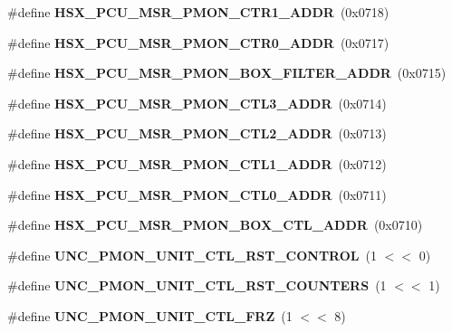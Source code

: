 \begin{DoxyCompactItemize}
\item 
\mbox{\label{types_8h_af364a115d3c96668cd4f7cc49de536c0}} 
\#define {\bfseries H\+S\+X\+\_\+\+P\+C\+U\+\_\+\+M\+S\+R\+\_\+\+P\+M\+O\+N\+\_\+\+C\+T\+R1\+\_\+\+A\+D\+DR}~(0x0718)
\item 
\mbox{\label{types_8h_a9c523fc1e96d8d3f84af7139e1aea411}} 
\#define {\bfseries H\+S\+X\+\_\+\+P\+C\+U\+\_\+\+M\+S\+R\+\_\+\+P\+M\+O\+N\+\_\+\+C\+T\+R0\+\_\+\+A\+D\+DR}~(0x0717)
\item 
\mbox{\label{types_8h_a4df4be5e87246efb1c7c5efc60c3d54b}} 
\#define {\bfseries H\+S\+X\+\_\+\+P\+C\+U\+\_\+\+M\+S\+R\+\_\+\+P\+M\+O\+N\+\_\+\+B\+O\+X\+\_\+\+F\+I\+L\+T\+E\+R\+\_\+\+A\+D\+DR}~(0x0715)
\item 
\mbox{\label{types_8h_ab6a84afc8059ff3fbdd3e31c4c5c7eab}} 
\#define {\bfseries H\+S\+X\+\_\+\+P\+C\+U\+\_\+\+M\+S\+R\+\_\+\+P\+M\+O\+N\+\_\+\+C\+T\+L3\+\_\+\+A\+D\+DR}~(0x0714)
\item 
\mbox{\label{types_8h_aff25e26c9829b71d5e152803b05d5b87}} 
\#define {\bfseries H\+S\+X\+\_\+\+P\+C\+U\+\_\+\+M\+S\+R\+\_\+\+P\+M\+O\+N\+\_\+\+C\+T\+L2\+\_\+\+A\+D\+DR}~(0x0713)
\item 
\mbox{\label{types_8h_ae4771b69f2b2f8768dfb6864f8f01938}} 
\#define {\bfseries H\+S\+X\+\_\+\+P\+C\+U\+\_\+\+M\+S\+R\+\_\+\+P\+M\+O\+N\+\_\+\+C\+T\+L1\+\_\+\+A\+D\+DR}~(0x0712)
\item 
\mbox{\label{types_8h_ae2ba1df84934237c90c8960b9b8087c8}} 
\#define {\bfseries H\+S\+X\+\_\+\+P\+C\+U\+\_\+\+M\+S\+R\+\_\+\+P\+M\+O\+N\+\_\+\+C\+T\+L0\+\_\+\+A\+D\+DR}~(0x0711)
\item 
\mbox{\label{types_8h_a9c0e92fd4e80ecf71b5872a577e7cab3}} 
\#define {\bfseries H\+S\+X\+\_\+\+P\+C\+U\+\_\+\+M\+S\+R\+\_\+\+P\+M\+O\+N\+\_\+\+B\+O\+X\+\_\+\+C\+T\+L\+\_\+\+A\+D\+DR}~(0x0710)
\item 
\mbox{\label{types_8h_a2791a8b16031170c377f19fe3242dc3f}} 
\#define {\bfseries U\+N\+C\+\_\+\+P\+M\+O\+N\+\_\+\+U\+N\+I\+T\+\_\+\+C\+T\+L\+\_\+\+R\+S\+T\+\_\+\+C\+O\+N\+T\+R\+OL}~(1 $<$$<$ 0)
\item 
\mbox{\label{types_8h_af99ec328bea18c0d005953e0ca3ba001}} 
\#define {\bfseries U\+N\+C\+\_\+\+P\+M\+O\+N\+\_\+\+U\+N\+I\+T\+\_\+\+C\+T\+L\+\_\+\+R\+S\+T\+\_\+\+C\+O\+U\+N\+T\+E\+RS}~(1 $<$$<$ 1)
\item 
\mbox{\label{types_8h_a9c0af4cfc28bb8f57b668380afe80731}} 
\#define {\bfseries U\+N\+C\+\_\+\+P\+M\+O\+N\+\_\+\+U\+N\+I\+T\+\_\+\+C\+T\+L\+\_\+\+F\+RZ}~(1 $<$$<$ 8)
\item 
\mbox{\label{types_8h_a290ac9135a844e71c013eab5745377b7}} 
$$
\end{DoxyCompactItemize}
